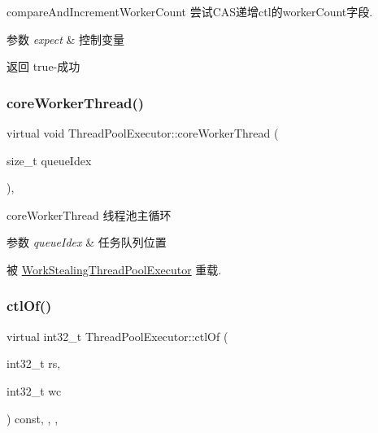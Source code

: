 compare\+And\+Increment\+Worker\+Count 尝试\+C\+A\+S递增ctl的worker\+Count字段. 


\begin{DoxyParams}{参数}
{\em expect} & 控制变量\\
\hline
\end{DoxyParams}
\begin{DoxyReturn}{返回}
true-\/成功 
\end{DoxyReturn}
\mbox{\label{classThreadPoolExecutor_a5e40839bf4191b5eab9d81227ddb62c3}} 
\subsubsection{\texorpdfstring{core\+Worker\+Thread()}{coreWorkerThread()}}
{\footnotesize\ttfamily virtual void Thread\+Pool\+Executor\+::core\+Worker\+Thread (\begin{DoxyParamCaption}\item[{size\+\_\+t}]{queue\+Idex }\end{DoxyParamCaption})\hspace{0.3cm}{\ttfamily [protected]}, {\ttfamily [virtual]}}



core\+Worker\+Thread 线程池主循环 


\begin{DoxyParams}{参数}
{\em queue\+Idex} & 任务队列位置 \\
\hline
\end{DoxyParams}


被 \hyperlink{classWorkStealingThreadPoolExecutor_ae4170b80bdc4ec806ee4a04cc5daaada}{Work\+Stealing\+Thread\+Pool\+Executor} 重载.

\mbox{\label{classThreadPoolExecutor_a31ed7a73571c79c8dbb486f27a4df4eb}} 
\subsubsection{\texorpdfstring{ctl\+Of()}{ctlOf()}}
{\footnotesize\ttfamily virtual int32\+\_\+t Thread\+Pool\+Executor\+::ctl\+Of (\begin{DoxyParamCaption}\item[{int32\+\_\+t}]{rs,  }\item[{int32\+\_\+t}]{wc }\end{DoxyParamCaption}) const\hspace{0.3cm}{\ttfamily [inline]}, {\ttfamily [final]}, {\ttfamily [protected]}, {\ttfamily [virtual]}}



